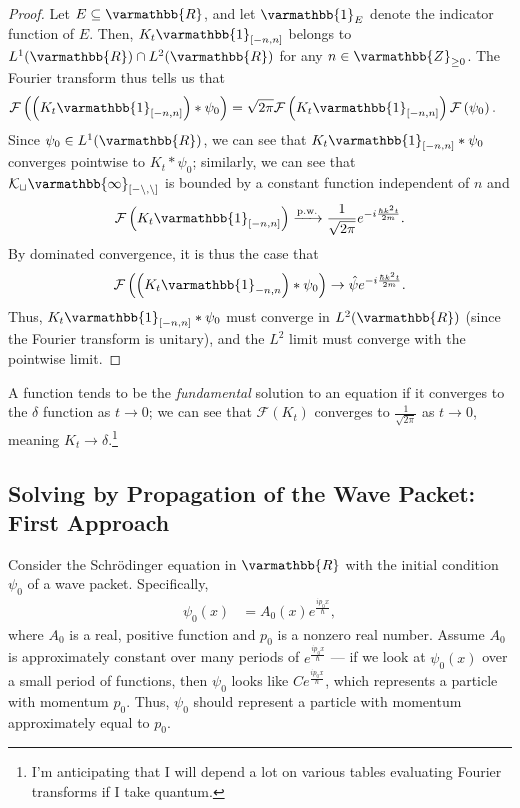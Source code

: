 \documentclass[12pt]{extarticle}
\newcommand{\Z}{\varmathbb{Z}}
\newcommand{\R}{\varmathbb{R}}
\theoremstyle{plain}
\theoremstyle{definition}
\theoremstyle{remark}
\renewcommand{\newline}{\hfill\break}
\begin{document}
  \begin{proof}
    Let $E\subseteq \R$, and let $\varmathbb{1}_E$ denote the indicator function of $E$. Then, $K_t \varmathbb{1}_{[-n,n]}$ belongs to $L^{1}(\R) \cap L^{2}(\R)$ for any $n \in \Z_{\geq 0}$. The Fourier transform thus tells us that
    \begin{align*}
      \mathcal{F}\left(\left(K_t \varmathbb{1}_{[-n,n]}\right)\ast \psi_0\right) &= \sqrt{2\pi}\mathcal{F}\left(K_t \varmathbb{1}_{[-n,n]}\right) \mathcal{F}\left(\psi_0\right).
    \end{align*}
    Since $\psi_0 \in L^{1}(\R)$, we can see that $K_t \varmathbb{1}_{[-n,n]}\ast \psi_0$ converges pointwise to $K_t\ast \psi_0$; similarly, we can see that $\mathcal{K_t \varmathbb{1}_{[-n,n]}}$ is bounded by a constant function independent of $n$ and
    \begin{align*}
      \mathcal{F}\left(K_t \varmathbb{1}_{[-n,n]}\right) \xrightarrow{\text{p.w.}} \frac{1}{\sqrt{2\pi}}e^{-i\frac{\hbar k^2t}{2m}}.
    \end{align*}
    By dominated convergence, it is thus the case that
    \begin{align*}
      \mathcal{F}\left(\left(K_t \varmathbb{1}_{-n,n}\right)\ast \psi_0\right) \rightarrow \hat{\psi}e^{-i\frac{\hbar k^2t}{2m}}.
    \end{align*}
    Thus, $K_t\varmathbb{1}_{[-n,n]}\ast \psi_0$ must converge in $L^2(\R)$ (since the Fourier transform is unitary), and the $L^2$ limit must converge with the pointwise limit.
  \end{proof}
  A function tends to be the \textit{fundamental} solution to an equation if it converges to the $\delta$ function as $t\rightarrow 0$; we can see that $\mathcal{F}\left(K_t\right)$ converges to $\frac{1}{\sqrt{2\pi}}$ as $t\rightarrow 0$, meaning $K_t \rightarrow \delta$.\footnote{I'm anticipating that I will depend a lot on various tables evaluating Fourier transforms if I take quantum.}
  \subsection{Solving by Propagation of the Wave Packet: First Approach}%
  Consider the Schrödinger equation in $\R$ with the initial condition $\psi_0$ of a wave packet. Specifically,
  \begin{align*}
    \psi_0(x) &= A_0(x)e^{\frac{ip_0x}{\hbar}},
  \end{align*}
  where $A_0$ is a real, positive function and $p_0$ is a nonzero real number. Assume $A_0$ is approximately constant over many periods of $e^{\frac{ip_0x}{\hbar}}$ --- if we look at $\psi_0(x)$ over a small period of functions, then $\psi_0$ looks like $Ce^{\frac{ip_0x}{\hbar}}$, which represents a particle with momentum $p_0$. Thus, $\psi_0$ should represent a particle with momentum approximately equal to $p_0$.\newline
\end{document}
